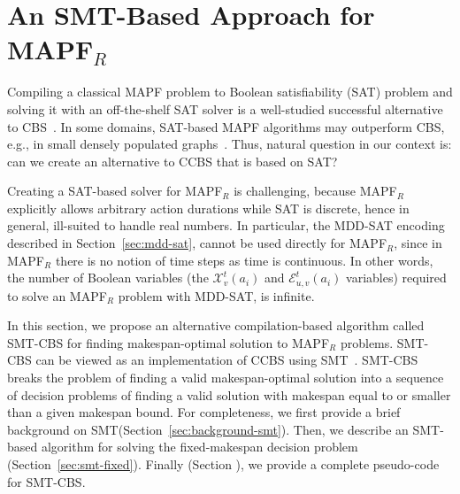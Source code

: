 \documentclass[review]{elsarticle}
\newcommand{\history}{past-conflicts\xspace}
\newcommand\roni[1]{\nb{\textbf{Roni:}}{green}{#1}}
\newcommand{\smt}{\ac{SMT}\xspace}
\newcommand{\ccbs}{\ac{CCBS}\xspace}
\newcommand{\cbs}{\ac{CBS}\xspace}
\newcommand{\mapfr}{\ac{MAPF}$_R$\xspace}
\newcommand{\mddsat}{MDD-SAT\xspace}
\newcommand{\smtcbs}{SMT-CBS\xspace}
\newcommand{\mapf}{\ac{MAPF}\xspace}
\begin{document}


\section{An SMT-Based Approach for \mapfr}

Compiling a classical \mapf problem to Boolean satisfiability (SAT) problem and solving it with an off-the-shelf SAT solver is a well-studied successful alternative to \cbs~\cite{surynek2012towards,surynek14compact,DBLP:conf/ecai/SurynekFSB16}. In some domains, SAT-based \mapf algorithms may outperform \cbs, e.g., in small densely populated graphs~\cite{surynekFSB16comparison,surynek17expansion}. 
Thus, natural question in our context is: can we create an alternative to \ccbs that is based on SAT?

Creating a SAT-based solver for \mapfr is challenging, because \mapfr explicitly allows arbitrary action durations while SAT is discrete, hence in general, ill-suited to handle real numbers. 
In particular, the \mddsat encoding described in Section~\ref{sec:mdd-sat}, cannot be used directly for \mapfr, since in \mapfr there is no notion of time steps as time is continuous. 
In other words, the number of Boolean variables (the 
$\mathcal{X}_{v}^{t}(a_i)$ and 
$\mathcal{E}_{u,v}^{t}(a_i)$ variables) required to solve an \mapfr problem with \mddsat, is infinite. 

In this section, we propose an alternative compilation-based algorithm called \smtcbs for finding makespan-optimal solution to \mapfr problems. \smtcbs can be viewed as an implementation of \ccbs using \smt~\cite{DBLP:journals/jacm/NieuwenhuisOT06,DBLP:journals/constraints/BofillPSV12,DBLP:conf/cp/Nieuwenhuis10}. 
\smtcbs breaks the problem of finding a valid makespan-optimal solution 
into a sequence of decision problems of finding a valid solution with makespan equal to or smaller than a given makespan bound. 
For completeness, we first provide a brief background on \smt (Section~\ref{sec:background-smt}). 
Then, we describe an \smt-based algorithm for solving the fixed-makespan decision problem (Section~\ref{sec:smt-fixed}). 
Finally (Section  \roni{TODO}), we provide a complete pseudo-code for \smtcbs. 
\end{document}
